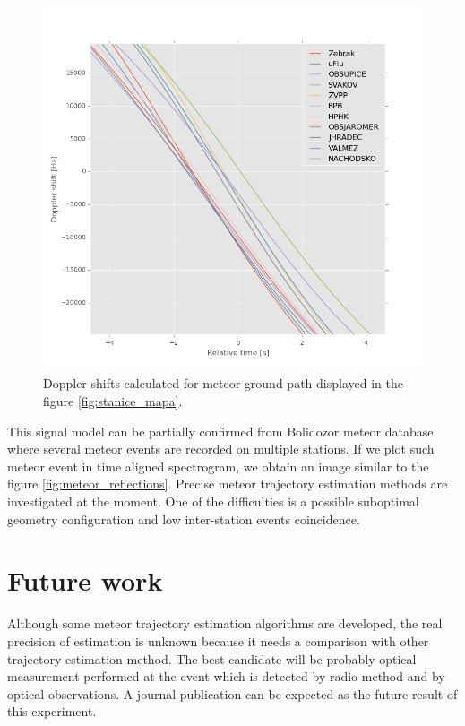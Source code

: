 \documentclass[twoside]{ctuthesis}
\theoremstyle{plain}
\theoremstyle{definition}
\theoremstyle{note}
\begin{document}
\begin{figure}
 \begin{center}
 \includegraphics[width=\textwidth]{./img/Meteor_dopplers.png}
 \caption{Doppler shifts calculated for meteor ground path displayed in the figure \ref{fig:stanice_mapa}.}
  \label{fig:dopplers} 
 \end{center}
\end{figure}


This signal model can be partially confirmed from Bolidozor meteor database where several meteor events are recorded on multiple stations. If we plot such meteor event in time aligned spectrogram, we obtain an image similar to the figure \ref{fig:meteor_reflections}.
Precise meteor trajectory estimation methods are investigated at the moment.  One of the difficulties is a possible suboptimal geometry configuration and low inter-station events coincidence.


\chapter{Future work}

Although some meteor trajectory estimation algorithms are developed, the real precision of estimation is unknown because it needs a comparison with other trajectory estimation method. The best candidate will be probably optical measurement performed at the event which is detected by radio method and by optical observations. A journal publication can be expected as the future result of this experiment. 
\end{document}
